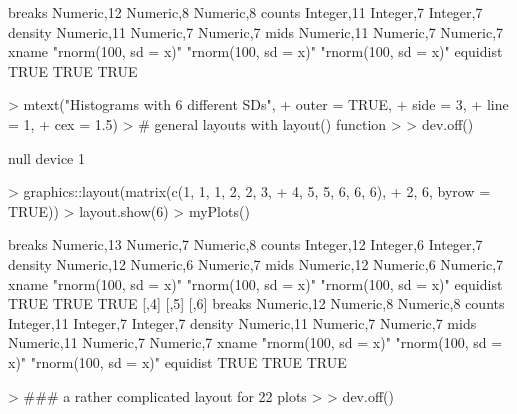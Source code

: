 \documentclass[12pt,letterpaper,final]{article}
\begin{document}
\begin{Schunk}
\begin{Soutput}
         [,4]                 [,5]                 [,6]                
breaks   Numeric,12           Numeric,8            Numeric,8           
counts   Integer,11           Integer,7            Integer,7           
density  Numeric,11           Numeric,7            Numeric,7           
mids     Numeric,11           Numeric,7            Numeric,7           
xname    "rnorm(100, sd = x)" "rnorm(100, sd = x)" "rnorm(100, sd = x)"
equidist TRUE                 TRUE                 TRUE                
\end{Soutput}
\begin{Sinput}
> mtext("Histograms with 6 different SDs", 
+       outer = TRUE,
+       side = 3,
+       line = 1,
+       cex = 1.5)
> # general layouts with layout() function
> 
> dev.off()
\end{Sinput}
\begin{Soutput}
null device 
          1 
\end{Soutput}
\begin{Sinput}
> graphics::layout(matrix(c(1, 1, 1, 2, 2, 3, 
+                           4, 5, 5, 6, 6, 6), 
+                         2, 6, byrow = TRUE)) 
> layout.show(6)
> myPlots()
\end{Sinput}
\begin{Soutput}
         [,1]                 [,2]                 [,3]                
breaks   Numeric,13           Numeric,7            Numeric,8           
counts   Integer,12           Integer,6            Integer,7           
density  Numeric,12           Numeric,6            Numeric,7           
mids     Numeric,12           Numeric,6            Numeric,7           
xname    "rnorm(100, sd = x)" "rnorm(100, sd = x)" "rnorm(100, sd = x)"
equidist TRUE                 TRUE                 TRUE                
         [,4]                 [,5]                 [,6]                
breaks   Numeric,12           Numeric,8            Numeric,8           
counts   Integer,11           Integer,7            Integer,7           
density  Numeric,11           Numeric,7            Numeric,7           
mids     Numeric,11           Numeric,7            Numeric,7           
xname    "rnorm(100, sd = x)" "rnorm(100, sd = x)" "rnorm(100, sd = x)"
equidist TRUE                 TRUE                 TRUE                
\end{Soutput}
\begin{Sinput}
> ### a rather complicated layout for 22 plots
> 
> dev.off()
\end{Sinput}
\begin{Soutput}

\end{Soutput}
\end{Schunk}
\end{document}
